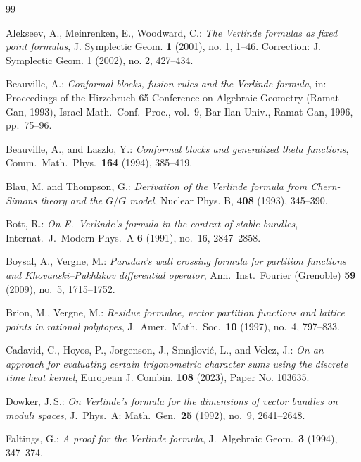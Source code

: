 \documentclass[11pt,reqno]{amsart}
\theoremstyle{remark}
\begin{document}
\begin{thebibliography}{99}

 Alekseev, A., Meinrenken, E., Woodward, C.: \emph{The
Verlinde formulas as fixed point formulas}, J. Symplectic Geom. \textbf{1}
(2001), no. 1, 1--46. Correction: J. Symplectic Geom. 1 (2002), no. 2,
427--434.

 Beauville, A.: \emph{Conformal blocks, fusion rules
and the Verlinde formula}, in: Proceedings of the Hirzebruch 65 Conference on
Algebraic Geometry (Ramat Gan, 1993), Israel Math.\ Conf.\ Proc., vol.\ 9,
Bar-Ilan Univ., Ramat Gan, 1996, pp.\ 75--96.

 Beauville, A., and Laszlo, Y.: \emph{Conformal blocks and
generalized theta functions}, Comm.\ Math.\ Phys.\ \textbf{164} (1994),
385--419.

 Blau, M. and Thompson, G.: \emph{Derivation of the
{V}erlinde formula from {C}hern-{S}imons theory and the {$G/G$} model},
Nuclear Phys. B, \textbf{408} (1993), 345--390.


 Bott, R.: \emph{On E.\ Verlinde's formula in the context
of stable bundles}, Internat.\ J.\ Modern Phys.\ A \textbf{6} (1991), no.\ 16,
2847--2858.

 Boysal, A., Vergne, M.: \emph{Paradan's wall crossing
formula for partition functions and Khovanski--Pukhlikov differential
operator}, Ann.\ Inst.\ Fourier (Grenoble) \textbf{59} (2009), no.\ 5,
1715--1752.

 Brion, M., Vergne, M.: \emph{Residue formulae, vector
partition functions and lattice points in rational polytopes}, J.\ Amer.\
Math.\ Soc.\ \textbf{10} (1997), no.\ 4, 797--833.


 Cadavid, C., Hoyos, P., Jorgenson, J.,
Smajlovi\'c, L., and Velez, J.: \emph{On an approach for evaluating certain
trigonometric character sums using the discrete time heat kernel}, European J.
Combin. \textbf{108} (2023), Paper No. 103635.

 Dowker, J.\,S.: \emph{On Verlinde's formula for the
dimensions of vector bundles on moduli spaces}, J.\ Phys.\ A: Math.\ Gen.\
\textbf{25} (1992), no.\ 9, 2641--2648.

 Faltings, G.: \emph{A proof for the Verlinde formula},
J.\ Algebraic Geom.\ \textbf{3} (1994), 347--374.



\end{thebibliography}
\end{document}
